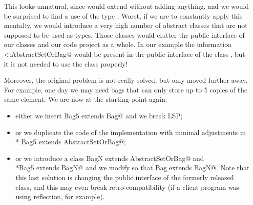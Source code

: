 This looks unnatural, since \Q@Set@ would extend \Q@AbstractSetOrBag@ without adding anything,
and we would be surprised to find a use of the type \Q@AbstractSetOrBag@.
Worst, if we are to constantly apply this mentalty, we would introduce a very high number
of abstract classes that are not supposed to be used as types. Those classes would clutter the 
public interface of our classes and our code project as a whole.
In our example the information \Q@Set<:AbstractSetOrBag@ would be present in the public interface
of the class \Q@Set@, but it is not needed to use the class properly!

Moreover, the original problem is not really solved, but only moved 
further away. For example, one day  we may need bags that can only store up to 5 copies of the same element.
We are now at the starting point again:
\begin{itemize}
\item either we insert \Q@class Bag5 extends Bag@ and we break LSP; 
\item or we duplicate the code of the \Q@Bag@ implementation with minimal
  adjustments in \\* \Q@class Bag5 extends AbstractSetOrBag@;
\item or we introduce a
\Q@abstract class BagN extends AbstractSetOrBag@ and \\*\Q@class Bag5 extends BagN@
and we modify \Q@Bag@ so that  \Q@class Bag extends BagN@.
Note that this last solution is changing the public interface of the formerly released \Q@Bag@ class, and
this may even break retro-compatibility (if a client program was using
reflection, for example).
\end{itemize}

